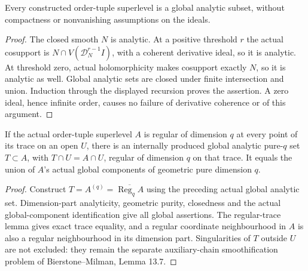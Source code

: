 \begin{theorem}
\label{hir:actual-lex-order-analytic-superlevels}
\leanok
Every constructed order-tuple superlevel is a global analytic subset,
without compactness or nonvanishing assumptions on the ideals.
\end{theorem}
\begin{proof}
The closed smooth $N$ is analytic. At a positive threshold $r$ the actual
cosupport is $N\cap V(\mathcal D_N^{r-1} I)$, with a coherent derivative
ideal, so it is analytic. At threshold zero, actual holomorphicity makes
cosupport exactly $N$, so it is analytic as well. Global analytic sets
are closed under finite intersection and union. Induction through the
displayed recursion proves the assertion. A zero ideal, hence infinite
order, causes no failure of derivative coherence or of this argument.
\end{proof}

\begin{theorem}
\label{hir:actual-lex-order-global-pure-extension}
\leanok
If the actual order-tuple superlevel $A$ is regular of dimension $q$ at
every point of its trace on an open $U$, there is an internally produced
global analytic pure-$q$ set $T\subset A$, with $T\cap U=A\cap U$,
regular of dimension $q$ on that trace. It equals the union of $A$'s
actual global components of geometric pure dimension $q$.
\end{theorem}
\begin{proof}
Construct $T=A^{(q)}=\overline{\operatorname{Reg}_q A}$ using the preceding
actual global analytic set. Dimension-part analyticity, geometric purity,
closedness and the actual global-component identification give all global
assertions. The regular-trace lemma gives exact trace equality, and a
regular coordinate neighbourhood in $A$ is also a regular neighbourhood
in its dimension part. Singularities of $T$ outside $U$ are not excluded:
they remain the separate auxiliary-chain smoothification problem of
Bierstone--Milman, Lemma 13.7.
\end{proof}


